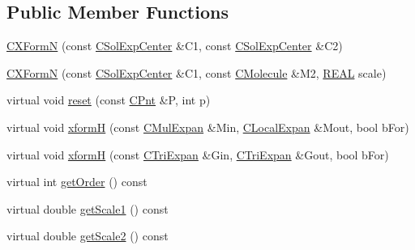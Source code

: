 \subsection*{Public Member Functions}
\begin{DoxyCompactItemize}
\item 
\hyperlink{classCXFormN_ac45d86206696c8f1346b5f97cf2ade9e}{C\-X\-Form\-N} (const \hyperlink{classCSolExpCenter}{C\-Sol\-Exp\-Center} \&C1, const \hyperlink{classCSolExpCenter}{C\-Sol\-Exp\-Center} \&C2)
\item 
\hyperlink{classCXFormN_ad109c6eda2bd99610d3ce8482f962fab}{C\-X\-Form\-N} (const \hyperlink{classCSolExpCenter}{C\-Sol\-Exp\-Center} \&C1, const \hyperlink{classCMolecule}{C\-Molecule} \&M2, \hyperlink{util_8h_a5821460e95a0800cf9f24c38915cbbde}{R\-E\-A\-L} scale)
\item 
virtual void \hyperlink{classCXFormN_a69a5a64ec063b3cd944b2757d64e52ae}{reset} (const \hyperlink{classCPnt}{C\-Pnt} \&P, int p)
\item 
virtual void \hyperlink{classCXFormN_a40db6fb4bc31ca580a9027e5746e2950}{xform\-H} (const \hyperlink{classCMulExpan}{C\-Mul\-Expan} \&Min, \hyperlink{classCLocalExpan}{C\-Local\-Expan} \&Mout, bool b\-For)
\item 
virtual void \hyperlink{classCXFormN_a8efc2d054609f23262d328c1a9940385}{xform\-H} (const \hyperlink{classCTriExpan}{C\-Tri\-Expan} \&Gin, \hyperlink{classCTriExpan}{C\-Tri\-Expan} \&Gout, bool b\-For)
\item 
virtual int \hyperlink{classCXFormN_a9c91a0b8e1826ace254d2945a63903ab}{get\-Order} () const 
\item 
virtual double \hyperlink{classCXFormN_a4ebee88d45d1e16ce04d186d963e33f4}{get\-Scale1} () const 
\item 
virtual double \hyperlink{classCXFormN_ae2b5c8f38ba8da876c61e64b076d52f1}{get\-Scale2} () const 
\end{DoxyCompactItemize}
